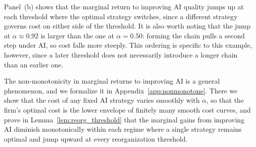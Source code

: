 \begin{example}
Panel~(b) shows that the marginal return to improving AI quality jumps up at each threshold where the optimal strategy switches, since a different strategy governs cost on either side of the threshold.
It is also worth noting that the jump at $\alpha \approx 0.92$ is larger than the one at $\alpha = 0.50$: forming the chain pulls a second step under AI, so cost falls more steeply.
This ordering is specific to this example, however, since a later threshold does not necessarily introduce a longer chain than an earlier one.
\end{example}

The non-monotonicity in marginal returns to improving AI is a general phenomenon, and we formalize it in Appendix~\ref{app:nonmonotone}.
There we show that the cost of any fixed AI strategy varies smoothly with $\alpha$, so that the firm's optimal cost is the lower envelope of finitely many smooth cost curves, and prove in Lemma~\ref{lem:reorg_threshold} that the marginal gains from improving AI diminish monotonically within each regime where a single strategy remains optimal and jump upward at every reorganization threshold.